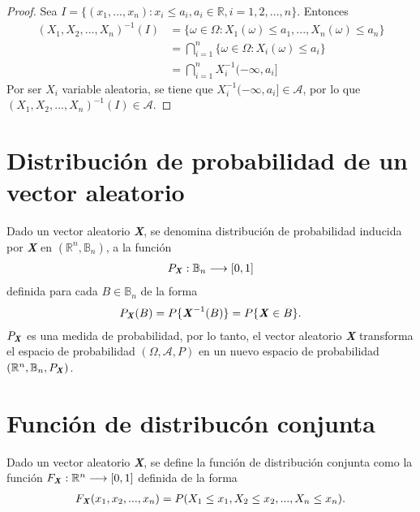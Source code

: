 \begin{proof}
Sea $I = \{ (x_1,...,x_n) : x_i \leq a_i, a_i \in \mathbb{R}, i = 1,2,...,n \}$. Entonces
\begin{align*}
    (X_1,X_2,...,X_n)^{-1}(I) &= \{ \omega \in \Omega : X_1(\omega) \leq a_1, ..., X_n(\omega) \leq a_n \} \\
    &= \bigcap_{i=1}^{n}{\{ \omega \in \Omega : X_i(\omega) \leq a_i \}}\\
    &= \bigcap_{i=1}^{n}{X_i^{-1}(-\infty,a_i]}
\end{align*}
Por ser $X_i$ variable aleatoria, se tiene que $X_i^{-1}(-\infty,a_i] \in \mathcal{A}$, por lo que $(X_1,X_2,...,X_n)^{-1}(I) \in \mathcal{A}$.
\end{proof}

\section{Distribución de probabilidad de un vector aleatorio}

Dado un vector aleatorio \textbf{\textit{X}}, se denomina distribución de probabilidad inducida por \textbf{\textit{X}} en $(\mathbb{R}^n, \mathbb{B}_n)$, a la función
\begin{align*}
    P_{\textbf{\textit{X}}} : \mathbb{B}_n \longrightarrow [0,1]
\end{align*}
definida para cada $B \in \mathbb{B}_n$ de la forma
\begin{align*}
    P_{\textbf{\textit{X}}}(B) = P\{ \textbf{\textit{X}}^{-1}(B) \} = P\{\textbf{\textit{X}} \in B \}.
\end{align*}
$P_{\textbf{\textit{X}}}$ es una medida de probabilidad, por lo tanto, el vector aleatorio \textbf{\textit{X}} transforma el espacio de probabilidad $(\Omega, \mathcal{A}, P)$ en un nuevo espacio de probabilidad $(\mathbb{R}^n, \mathbb{B}_n, P_{\textbf{\textit{X}}})$.

\section{Función de distribucón conjunta}

Dado un vector aleatorio \textbf{\textit{X}}, se define la función de distribución conjunta como la función $F_{\textbf{\textit{X}}} : \mathbb{R}^n \longrightarrow [0,1]$ definida de la forma
\begin{align*}
    F_{\textbf{\textit{X}}}(x_1,x_2,...,x_n) = P(X_1 \leq x_1, X_2 \leq x_2, ..., X_n \leq x_n).
\end{align*}

